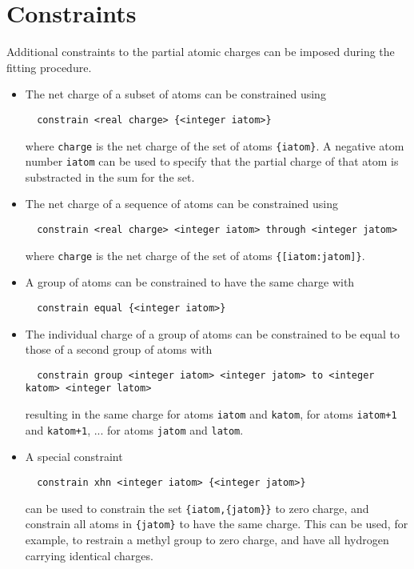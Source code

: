 \section{Constraints}
Additional constraints to the partial atomic charges can be imposed during
the fitting procedure.
\begin{itemize}
\item
The net charge of a subset of atoms can be constrained using
\begin{verbatim}
  constrain <real charge> {<integer iatom>}
\end{verbatim}
where \verb+charge+ is the net charge of the set of atoms \verb+{iatom}+.
A negative atom number \verb+iatom+ can be used to specify that the
partial charge of that atom is substracted in the sum for the set.
\item
The net charge of a sequence of atoms can be constrained using
\begin{verbatim}
  constrain <real charge> <integer iatom> through <integer jatom>
\end{verbatim}
where \verb+charge+ is the net charge of the set of atoms \verb+{[iatom:jatom]}+.
\item
A group of atoms can be constrained to have the same charge with
\begin{verbatim}
  constrain equal {<integer iatom>}
\end{verbatim}
\item
The individual charge of a group of atoms can be constrained to be equal to
those of a second group of atoms with
\begin{verbatim}
  constrain group <integer iatom> <integer jatom> to <integer katom> <integer latom>
\end{verbatim}
resulting in the same charge for atoms \verb+iatom+ and \verb+katom+, for
atoms \verb.iatom+1. and \verb.katom+1., ... for atoms \verb+jatom+ and \verb+latom+.
\item
A special constraint
\begin{verbatim}
  constrain xhn <integer iatom> {<integer jatom>}
\end{verbatim}
can be used to constrain the set \verb+{iatom,{jatom}}+ to zero charge, and
constrain all atoms in \verb+{jatom}+ to have the same charge. This can be used,
for example, to restrain a methyl group to zero charge, and have all hydrogen
carrying identical charges.
\end{itemize}

